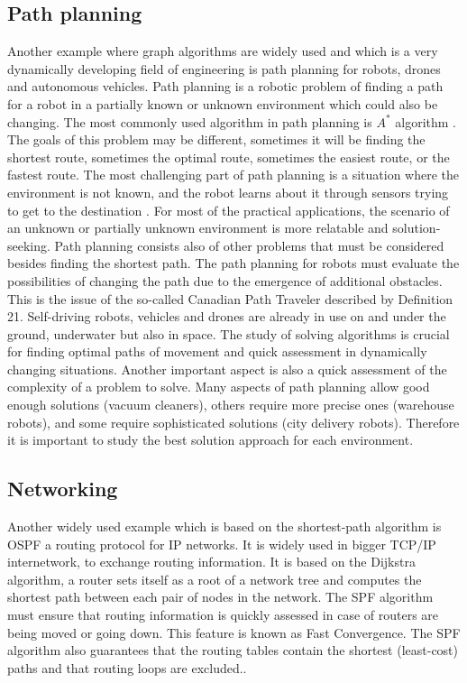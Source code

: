 \subsection{Path planning}
Another example where graph algorithms are widely used and which is a very dynamically developing field of engineering is path planning for robots, drones 
and autonomous vehicles. Path planning is a robotic problem of finding a path for a robot in a partially known or unknown environment which could also be changing. The most 
commonly used algorithm in path planning is $A^*$ algorithm \cite{Liu}. The goals of this problem may be different, sometimes it will be finding the shortest route, 
sometimes the optimal route, sometimes the easiest route, or the fastest route. The most challenging part of path planning is a situation where the environment is not known, 
and the robot learns about it through sensors trying to get to the destination \cite{Montazeri}. For most of the practical applications, the scenario of an unknown or
partially unknown environment is more relatable and solution-seeking. Path planning consists also of other problems that must be considered besides finding the shortest path.
The path planning for robots must evaluate the possibilities of changing the path due to the emergence of additional obstacles. This is the issue of the so-called Canadian Path Traveler
described by Definition 21. Self-driving robots, vehicles and drones are already in use on and under the ground, underwater but also in space. The study of solving algorithms
is crucial for finding optimal paths of movement and quick assessment in dynamically changing situations. Another important aspect is also a quick assessment of the
complexity of a problem to solve. Many aspects of path planning allow good enough solutions (vacuum cleaners), others require more precise ones (warehouse robots), and some require 
sophisticated solutions (city delivery robots)\cite{Starahip}. Therefore it is important to study the best solution approach for each environment.
\subsection{Networking}
Another widely used example which is based on the shortest-path algorithm is OSPF a routing protocol for  IP networks. It is widely used in bigger TCP/IP internetwork, 
to exchange routing information. It is based on the Dijkstra algorithm, a router sets itself as a root of a network tree and computes the shortest path between each pair 
of nodes in the network. The SPF algorithm must ensure that routing information is quickly assessed in case of routers are being moved or going down. 
This feature is known as Fast Convergence. The SPF algorithm also guarantees that the routing tables contain the shortest (least-cost) paths and that routing loops are excluded.\cite{ospf}.
